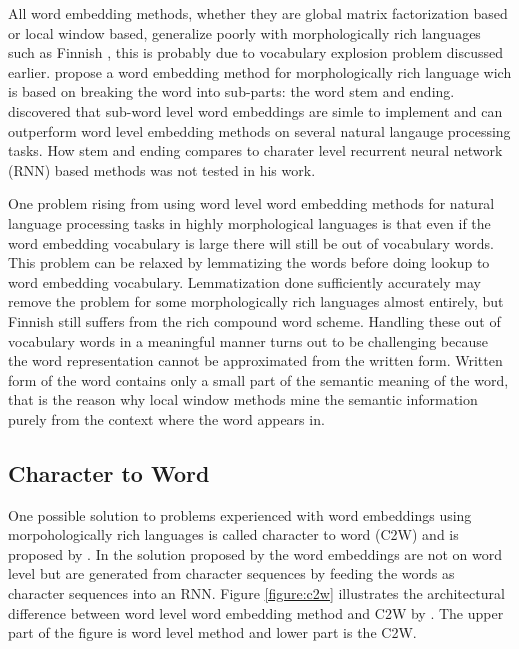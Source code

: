 \documentclass[12pt,a4paper,english
]{tutthesis}
\begin{document}
All word embedding methods, whether they are global matrix factorization based or local window based, generalize poorly with morphologically rich languages such as Finnish \cite{Takala2016}, this is probably due to vocabulary explosion problem discussed earlier. \cite{Takala2016} propose a word embedding method for morphologically rich language wich is based on breaking the word into sub-parts: the word stem and ending. \cite{Takala2016} discovered that sub-word level word embeddings are simle to implement and can outperform word level embedding methods on several natural langauge processing tasks. How stem and ending compares to charater level recurrent neural network (RNN) based methods was not tested in his work.

One problem rising from using word level word embedding methods for natural language processing tasks in highly morphological languages is that even if the word embedding vocabulary is large there will still be out of vocabulary words. This problem can be relaxed by lemmatizing the words before doing lookup to word embedding vocabulary. Lemmatization done sufficiently accurately may remove the problem for some morphologically rich languages almost entirely, but Finnish still suffers from the rich compound word scheme. Handling these out of vocabulary words in a meaningful manner turns out to be challenging because the word representation cannot be approximated from the written form. Written form of the word contains only a small part of the semantic meaning of the word, that is the reason why local window methods mine the semantic information purely from the context where the word appears in.

\subsection{Character to Word}
One possible solution to problems experienced with word embeddings using morpohologically rich languages is called character to word (C2W) and is proposed by \cite{Ling2015}. In the solution proposed by \cite{Ling2015} the word embeddings are not on word level but are generated from character sequences by feeding the words as character sequences into an RNN. Figure \ref{figure:c2w} illustrates the architectural difference between word level word embedding method and C2W by \cite{Ling2015}. The upper part of the figure is word level method and lower part is the C2W.
\end{document}
